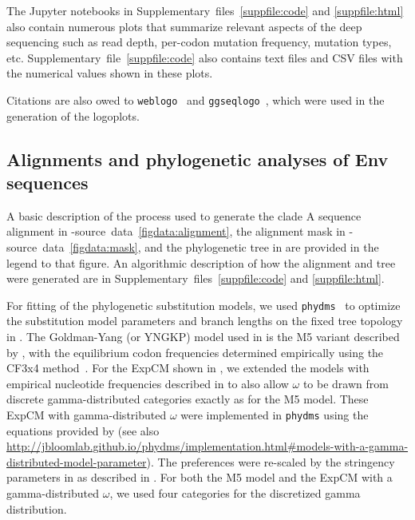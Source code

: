 \documentclass[9pt]{elife}
\begin{document}
The Jupyter notebooks in Supplementary~files~\ref{suppfile:code} and \ref{suppfile:html} also contain numerous plots that summarize relevant aspects of the deep sequencing such as read depth, per-codon mutation frequency, mutation types, etc.
Supplementary~file~\ref{suppfile:code} also contains text files and CSV files with the numerical values shown in these plots.

Citations are also owed to \texttt{weblogo}~\citep[][\url{http://weblogo.threeplusone.com/}]{crooks2004weblogo} and \texttt{ggseqlogo}~\citep[][\url{https://omarwagih.github.io/ggseqlogo/}]{wagih2017ggseqlogo}, which were used in the generation of the logoplots. 

\subsection{Alignments and phylogenetic analyses of Env sequences}
A basic description of the process used to generate the clade A sequence alignment in -source~data~\ref{figdata:alignment}, the alignment mask in -source~data~\ref{figdata:mask}, and the phylogenetic tree in  are provided in the legend to that figure.
An algorithmic description of how the alignment and tree were generated are in Supplementary~files~\ref{suppfile:code} and \ref{suppfile:html}.

For fitting of the phylogenetic substitution models, we used \texttt{phydms}~\citep[][\url{http://jbloomlab.github.io/phydms/}, version 2.2.1]{hilton2017phydms} to optimize the substitution model parameters and branch lengths on the fixed tree topology in .
The Goldman-Yang (or YNGKP) model used in  is the M5 variant described by \citet{yang2000codon}, with the equilibrium codon frequencies determined empirically using the CF3x4 method~\citep{pond2010correcting}.
For the ExpCM shown in , we extended the models with empirical nucleotide frequencies described in \citet{hilton2017phydms} to also allow $\omega$ to be drawn from discrete gamma-distributed categories exactly as for the M5 model.
These ExpCM with gamma-distributed $\omega$ were implemented in \texttt{phydms} using the equations provided by \citet{yang1994maximum} (see also \url{http://jbloomlab.github.io/phydms/implementation.html#models-with-a-gamma-distributed-model-parameter}).
The preferences were re-scaled by the stringency parameters in  as described in \citet{hilton2017phydms}.
For both the M5 model and the ExpCM with a gamma-distributed $\omega$, we used four categories for the discretized gamma distribution.
\end{document}
